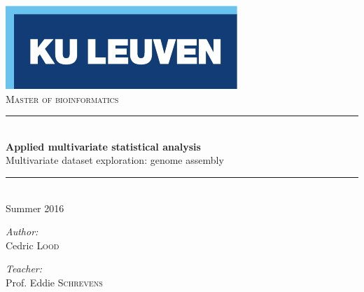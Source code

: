 \begin{titlepage}
  \begin{center}
    
    \includegraphics[scale=1.5]{figures/kuleuven_logo.pdf}~\\[4.5cm]
    \textsc{\Large Master of bioinformatics}\\[0.5cm]

    \rule{\linewidth}{0.3mm}\\[0.4cm]
    {\huge \bfseries Applied multivariate statistical analysis} \\[0.4cm]
    {\large Multivariate dataset exploration: genome assembly} \\[0.4cm]
    \rule{\linewidth}{0.3mm}\\[0.4cm]
    {\large Summer 2016} \\[1.0cm]
    
    \begin{minipage}{0.4\textwidth}
      \begin{flushleft} \large
        \emph{Author:}\\
	Cedric \textsc{Lood}
      \end{flushleft}
    \end{minipage}
    \begin{minipage}{0.4\textwidth}
      \vspace{25pt}
      \begin{flushright} \large
        \emph{Teacher:} \\
        Prof. Eddie \textsc{Schrevens}\\
        \hfill \newline 
      \end{flushright}
    \end{minipage}
    
    \vfill


\end{center}
\end{titlepage}
